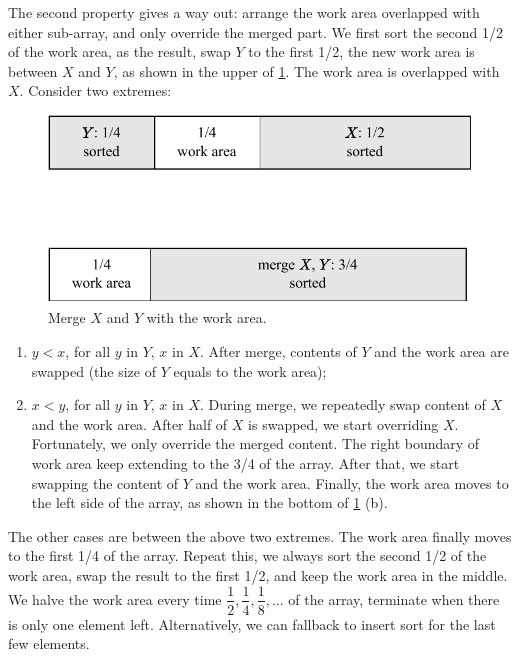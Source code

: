 \documentclass[b5paper]{article}
\begin{document}
The second property gives a way out: arrange the work area overlapped with either sub-array, and only override the merged part. We first sort the second 1/2 of the work area, as the result, swap $Y$ to the first 1/2, the new work area is between $X$ and $Y$, as shown in the upper of \cref{fig:merge-in-place-setup}. The work area is overlapped with $X$\cite{msort-in-place}. Consider two extremes:

\begin{figure}[htbp]
 \centering
 \includegraphics[scale=0.8]{img/workarea-2}
 \caption{Merge $X$ and $Y$ with the work area.}
 \label{fig:merge-in-place-setup}
\end{figure}

\begin{enumerate}
\item $y < x$, for all $y$ in $Y$, $x$ in $X$. After merge, contents of $Y$ and the work area are swapped (the size of $Y$ equals to the work area);
\item $x < y$, for all $y$ in $Y$, $x$ in $X$. During merge, we repeatedly swap content of $X$ and the work area. After half of $X$ is swapped, we start overriding $X$. Fortunately, we only override the merged content. The right boundary of work area keep extending to the 3/4 of the array. After that, we start swapping the content of $Y$ and the work area. Finally, the work area moves to the left side of the array, as shown in the bottom of \cref{fig:merge-in-place-setup} (b).
\end{enumerate}

The other cases are between the above two extremes. The work area finally moves to the first 1/4 of the array. Repeat this, we always sort the second 1/2 of the work area, swap the result to the first 1/2, and keep the work area in the middle. We halve the work area every time $\dfrac{1}{2}, \dfrac{1}{4}, \dfrac{1}{8}, ...$ of the array, terminate when there is only one element left. Alternatively, we can fallback to insert sort for the last few elements.
\end{document}
